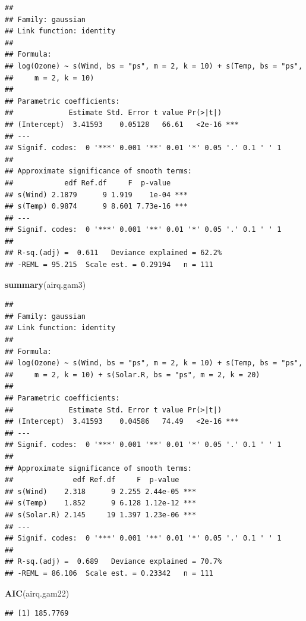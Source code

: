 \documentclass[]{book}
\newenvironment{Shaded}{\begin{snugshade}}{\end{snugshade}}
\newcommand{\KeywordTok}[1]{\textcolor[rgb]{0.13,0.29,0.53}{\textbf{#1}}}
\newcommand{\NormalTok}[1]{#1}
\begin{document}
\begin{verbatim}
## 
## Family: gaussian 
## Link function: identity 
## 
## Formula:
## log(Ozone) ~ s(Wind, bs = "ps", m = 2, k = 10) + s(Temp, bs = "ps", 
##     m = 2, k = 10)
## 
## Parametric coefficients:
##             Estimate Std. Error t value Pr(>|t|)    
## (Intercept)  3.41593    0.05128   66.61   <2e-16 ***
## ---
## Signif. codes:  0 '***' 0.001 '**' 0.01 '*' 0.05 '.' 0.1 ' ' 1
## 
## Approximate significance of smooth terms:
##            edf Ref.df     F  p-value    
## s(Wind) 2.1879      9 1.919    1e-04 ***
## s(Temp) 0.9874      9 8.601 7.73e-16 ***
## ---
## Signif. codes:  0 '***' 0.001 '**' 0.01 '*' 0.05 '.' 0.1 ' ' 1
## 
## R-sq.(adj) =  0.611   Deviance explained = 62.2%
## -REML = 95.215  Scale est. = 0.29194   n = 111
\end{verbatim}

\begin{Shaded}
\begin{Highlighting}[]
\KeywordTok{summary}\NormalTok{(airq.gam3)}
\end{Highlighting}
\end{Shaded}

\begin{verbatim}
## 
## Family: gaussian 
## Link function: identity 
## 
## Formula:
## log(Ozone) ~ s(Wind, bs = "ps", m = 2, k = 10) + s(Temp, bs = "ps", 
##     m = 2, k = 10) + s(Solar.R, bs = "ps", m = 2, k = 20)
## 
## Parametric coefficients:
##             Estimate Std. Error t value Pr(>|t|)    
## (Intercept)  3.41593    0.04586   74.49   <2e-16 ***
## ---
## Signif. codes:  0 '***' 0.001 '**' 0.01 '*' 0.05 '.' 0.1 ' ' 1
## 
## Approximate significance of smooth terms:
##              edf Ref.df     F  p-value    
## s(Wind)    2.318      9 2.255 2.44e-05 ***
## s(Temp)    1.852      9 6.128 1.12e-12 ***
## s(Solar.R) 2.145     19 1.397 1.23e-06 ***
## ---
## Signif. codes:  0 '***' 0.001 '**' 0.01 '*' 0.05 '.' 0.1 ' ' 1
## 
## R-sq.(adj) =  0.689   Deviance explained = 70.7%
## -REML = 86.106  Scale est. = 0.23342   n = 111
\end{verbatim}

\begin{Shaded}
\begin{Highlighting}[]
\KeywordTok{AIC}\NormalTok{(airq.gam22)}
\end{Highlighting}
\end{Shaded}

\begin{verbatim}
## [1] 185.7769
\end{verbatim}
\end{document}
